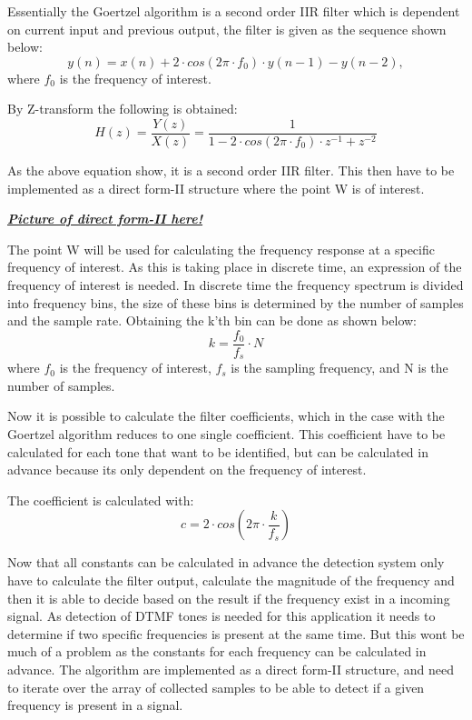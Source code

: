 		Essentially the Goertzel algorithm is a second order IIR filter which is dependent on current input and previous
		output, the filter is given as the sequence shown below:
		\begin{equation}y(n) = x(n) + 2\cdot cos(2\pi \cdot f_{0})\cdot y(n - 1) - y(n - 2),\end{equation}
		where $f_{0}$ is the frequency of interest.
		
		By Z-transform the following is obtained:
		\begin{equation}H(z) = \frac{Y(z)}{X(z)} = \frac{1}{1 - 2\cdot cos(2\pi \cdot f_{0})\cdot z^{-1} + z^{-2}}\end{equation}
		
		As the above equation show, it is a second order IIR filter. This then have to be implemented as a direct form-II structure
		where the point W is of interest.
		
		\textbf{\textit{\underline{Picture of direct form-II here!}}}
		
		The point W will be used for calculating the frequency response at a specific frequency of interest. As this is taking
		place in discrete time, an expression of the frequency of interest is needed. In discrete time the frequency spectrum
		is divided into frequency bins, the size of these bins is determined by the number of samples and the sample rate.
		Obtaining the k'th bin can be done as shown below:
		\begin{equation}k = \frac{f_{0}}{f_{s}}\cdot N\end{equation}
		where $f_{0}$ is the frequency of interest, $f_{s}$ is the sampling frequency, and N is the number of samples.
		
		Now it is possible to calculate the filter coefficients, which in the case with the Goertzel algorithm reduces 
		to one single coefficient. This coefficient have to be calculated for each tone that want to be identified, but can 
		be calculated in advance because its only dependent on the frequency of interest.
		
		The coefficient is calculated with:
		\begin{equation}c = 2\cdot cos(2\pi \cdot \frac{k}{f_{s}})\end{equation}
		
		Now that all constants can be calculated in advance the detection system only have to calculate the filter output, calculate
		the magnitude of the frequency and then it is able to decide based on the result if the frequency exist in a incoming signal.
		As detection of DTMF tones is needed for this application it needs to determine if two specific frequencies is present at the
		same time. But this wont be much of a problem as the constants for each frequency can be calculated in advance.
		The algorithm are implemented as a direct form-II structure, and need to iterate over the array of collected samples to be
		able to detect if a given frequency is present in a signal.
		
